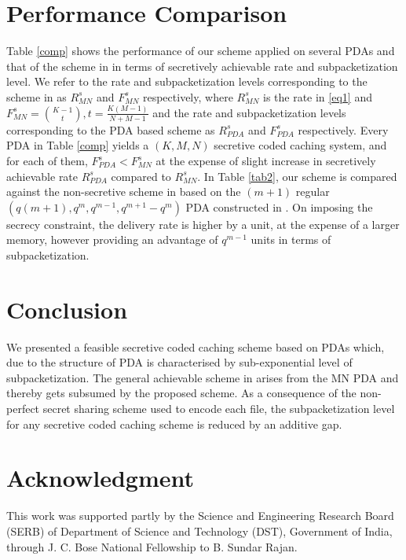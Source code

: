 \documentclass[conference]{IEEEtran}
\begin{document}
\section{Performance Comparison}
\label{sec6}
Table \ref{comp} shows the performance of our scheme applied on several PDAs \cite{PDAmain,PDAhyperg} and that of the scheme in \cite{PrivateCc} in terms of secretively achievable rate and subpacketization level. We refer to the rate and subpacketization levels corresponding to the scheme in \cite{PrivateCc} as $R^s_{MN}$ and $F^s_{MN}$ respectively, where $R^s_{MN}$ is the rate in \eqref{eq1} and $F^s_{MN}=\binom{K-1}{t},t=\frac{K(M-1)}{N+M-1}$ and the rate and subpacketization levels corresponding to the PDA based scheme as $R^s_{PDA}$ and $F^s_{PDA}$ respectively. Every PDA in Table \ref{comp} yields a $(K,M,N)$ secretive coded caching system, and for each of them, $F^s_{PDA}<F^s_{MN}$ at the expense of slight increase in secretively achievable rate $R^s_{PDA}$ compared to $R^s_{MN}$. In Table \ref{tab2}, our scheme is compared against the non-secretive scheme in \cite{PDAmain} based on the $(m+1)$ regular $(q(m+1),q^m,q^{m-1},q^{m+1}-q^m)$ PDA constructed in \cite{PDAmain}. On imposing the secrecy constraint, the delivery rate is higher by a unit, at the expense of a larger memory, however providing an advantage of $q^{m-1}$ units in terms of subpacketization.
\section{Conclusion}\label{sec7}
We presented a feasible secretive coded caching scheme based on PDAs which, due to the structure of PDA is characterised by sub-exponential level of subpacketization. The general achievable scheme in \cite{PrivateCc} arises from the MN PDA and thereby gets subsumed by the proposed scheme. As a consequence of the non-perfect secret sharing scheme used to encode each file, the subpacketization level for any secretive coded caching scheme is reduced by an additive gap.
\section*{Acknowledgment}
This work was supported partly by the Science and Engineering Research Board (SERB) of Department of Science and Technology (DST), Government of India, through J. C. Bose National Fellowship to B. Sundar Rajan.
\end{document}
